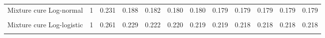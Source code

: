 \documentclass[
]{article}
\begin{document}
\begin{table}[H]
{\begin{tabular}[t]{lrrrrrrrrrrr}
Mixture cure Log-normal & 1 & 0.231 & 0.188 & 0.182 & 0.180 & 0.180 & 0.179 & 0.179 & 0.179 & 0.179 & 0.179\\
\cellcolor{gray!10}{Non-mixture cure Log-normal} & \cellcolor{gray!10}{1} & \cellcolor{gray!10}{0.241} & \cellcolor{gray!10}{0.191} & \cellcolor{gray!10}{0.180} & \cellcolor{gray!10}{0.176} & \cellcolor{gray!10}{0.175} & \cellcolor{gray!10}{0.174} & \cellcolor{gray!10}{0.174} & \cellcolor{gray!10}{0.173} & \cellcolor{gray!10}{0.173} & \cellcolor{gray!10}{0.173}\\
Mixture cure Log-logistic & 1 & 0.261 & 0.229 & 0.222 & 0.220 & 0.219 & 0.219 & 0.218 & 0.218 & 0.218 & 0.218\\
\cellcolor{gray!10}{Non-mixture cure Log-logistic} & \cellcolor{gray!10}{1} & \cellcolor{gray!10}{0.271} & \cellcolor{gray!10}{0.242} & \cellcolor{gray!10}{0.236} & \cellcolor{gray!10}{0.234} & \cellcolor{gray!10}{0.233} & \cellcolor{gray!10}{0.232} & \cellcolor{gray!10}{0.232} & \cellcolor{gray!10}{0.232} & \cellcolor{gray!10}{0.232} & \cellcolor{gray!10}{0.232}\\
\bottomrule
\end{tabular}}
\end{table}
\end{document}
